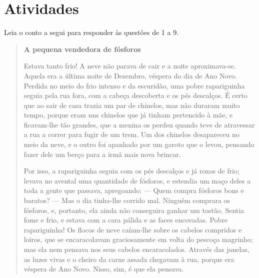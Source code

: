 \section{Atividades}

Leia o conto a segui para responder às questões de 1 a 9.


\begin{quote}
\textbf{A pequena vendedora de fósforos}


Estava tanto frio! A neve não parava de cair e a noite aproximava-se.
Aquela era a última noite de Dezembro, véspera do dia de Ano Novo.
Perdida no meio do frio intenso e da escuridão, uma pobre rapariguinha
seguia pela rua fora, com a cabeça descoberta e os pés descalços. É
certo que ao sair de casa trazia um par de chinelos, mas não duraram
muito tempo, porque eram uns chinelos que já tinham pertencido à mãe, e
ficavam-lhe tão grandes, que a menina os perdeu quando teve de
atravessar a rua a correr para fugir de um trem. Um dos chinelos
desapareceu no meio da neve, e o outro foi apanhado por um garoto que o
levou, pensando fazer dele um berço para a irmã mais nova brincar.

Por isso, a rapariguinha seguia com os pés descalços e já roxos de frio;
levava no avental uma quantidade de fósforos, e estendia um maço deles a
toda a gente que passava, apregoando: --- Quem compra fósforos bons e
baratos? --- Mas o dia tinha-lhe corrido mal. Ninguém comprara os
fósforos, e, portanto, ela ainda não conseguira ganhar um tostão. Sentia
fome e frio, e estava com a cara pálida e as faces encovadas. Pobre
rapariguinha! Os flocos de neve caíam-lhe sobre os cabelos compridos e
loiros, que se encaracolavam graciosamente em volta do pescoço magrinho;
mas ela nem pensava nos seus cabelos encaracolados. Através das janelas,
as luzes vivas e o cheiro da carne assada chegavam à rua, porque era
véspera de Ano Novo. Nisso, sim, é que ela pensava.


\end{quote}
